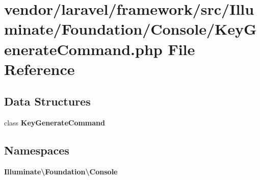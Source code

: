 \section{vendor/laravel/framework/src/\+Illuminate/\+Foundation/\+Console/\+Key\+Generate\+Command.php File Reference}
\label{_key_generate_command_8php}
\subsection*{Data Structures}
\begin{DoxyCompactItemize}
\item 
class {\bf Key\+Generate\+Command}
\end{DoxyCompactItemize}
\subsection*{Namespaces}
\begin{DoxyCompactItemize}
\item 
 {\bf Illuminate\textbackslash{}\+Foundation\textbackslash{}\+Console}
\end{DoxyCompactItemize}
